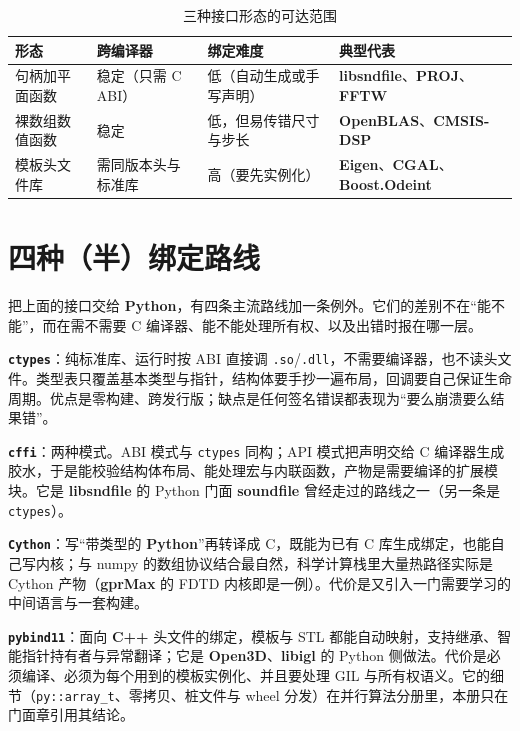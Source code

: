 \documentclass[12pt,a4paper,fontset=fandol]{ctexbook}
\newcommand{\Tp}[1]{\texttt{#1}}
\newcommand{\Bk}{\allowbreak}
\newcommand{\Lib}[1]{\textbf{#1}}
\newcommand{\Lang}[1]{\textsf{\bfseries #1}}
\newcommand{\CPP}{\Lang{C++}}
\newcommand{\PY}{\Lang{Python}}
\begin{document}
\begin{table}[H]
\centering
\caption{三种接口形态的可达范围}
\label{tab:ch02-forms}
\small
\begin{tabular}{@{}>{\raggedright\arraybackslash}p{}
  >{\raggedright\arraybackslash}p{}
  >{\raggedright\arraybackslash}p{}
  >{\raggedright\arraybackslash}p{}@{}}
\toprule
形态 & 跨编译器 & 绑定难度 & 典型代表 \\
\midrule
句柄加平面函数 & 稳定（只需 C ABI） &
  低（自动生成或手写声明） &
  \Lib{libsndfile}、\Lib{PROJ}、\Lib{FFTW} \\
裸数组数值函数 & 稳定 &
  低，但易传错尺寸与步长 &
  \Lib{OpenBLAS}、\Lib{CMSIS-DSP} \\
模板头文件库 & 需同版本头与标准库 &
  高（要先实例化） &
  \Lib{Eigen}、\Lib{CGAL}、\Lib{Boost.Odeint} \\
\bottomrule
\end{tabular}
\end{table}

\section{四种（半）绑定路线}

把上面的接口交给 \PY{}，有四条主流路线加一条例外。它们的差别不在``能不能''，而在需不需要 C 编译器、能不能处理所有权、以及出错时报在哪一层。

\textbf{\Tp{ctypes}}：纯标准库、运行时按 ABI 直接调 \Tp{.so}/{\Bk}\Tp{.dll}，不需要编译器，也不读头文件。类型表只覆盖基本类型与指针，结构体要手抄一遍布局，回调要自己保证生命周期。优点是零构建、跨发行版；缺点是任何签名错误都表现为``要么崩溃要么结果错''。

\textbf{\Tp{cffi}}：两种模式。ABI 模式与 \Tp{ctypes} 同构；API 模式把声明交给 C 编译器生成胶水，于是能校验结构体布局、能处理宏与内联函数，产物是需要编译的扩展模块。它是 \Lib{libsndfile} 的 Python 门面 \Lib{soundfile} 曾经走过的路线之一（另一条是 \Tp{ctypes}）。

\textbf{\Tp{Cython}}：写``带类型的 \PY{}''再转译成 C，既能为已有 C 库生成绑定，也能自己写内核；与 numpy 的数组协议结合最自然，科学计算栈里大量热路径实际是 Cython 产物（\Lib{gprMax} 的 FDTD 内核即是一例）。代价是又引入一门需要学习的中间语言与一套构建。

\textbf{\Tp{pybind11}}：面向 \CPP{} 头文件的绑定，模板与 STL 都能自动映射，支持继承、智能指针持有者与异常翻译；它是 \Lib{Open3D}、\Lib{libigl} 的 Python 侧做法。代价是必须编译、必须为每个用到的模板实例化、并且要处理 GIL 与所有权语义。它的细节（\Tp{py::array\_t}、零拷贝、桩文件与 wheel 分发）在并行算法分册里，本册只在门面章引用其结论。
\end{document}
